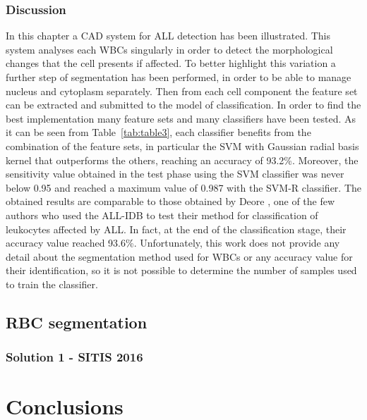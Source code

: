 \documentclass[final,a4paper,12pt,english]{UnicaPhdThesis3}
\begin{document}
\section{Discussion}
In this chapter a CAD system for ALL detection has been illustrated. This system analyses each WBCs singularly in order to detect the morphological changes that the cell presents if affected. To better highlight this variation a further step of segmentation has been performed, in order to be able to manage nucleus and cytoplasm separately. Then from each cell component the feature set can be extracted and submitted to the model of classification. In order to find the best implementation many feature sets and many classifiers have been tested. As it can be seen from Table~\ref{tab:table3}, each classifier benefits from the combination of the feature sets, in particular the SVM with Gaussian radial basis kernel that outperforms the others, reaching an accuracy of 93.2\%. Moreover, the sensitivity value obtained  in the test  phase using the SVM classifier was never below 0.95 and reached a maximum  value of 0.987 with the SVM-R classifier. The obtained results are comparable to those obtained by Deore \cite{Deore}, one of the few authors who used the ALL-IDB to test their method for classification of leukocytes affected by ALL. In fact, at  the end of the classification stage, their accuracy value reached 93.6\%. Unfortunately, this work does not provide any detail about the segmentation  method used for WBCs or any accuracy  value for their  identification,  so it is not possible to determine  the number of samples used to train the classifier.

\chapter{RBC segmentation}
\section{Solution 1 - SITIS 2016}

\part{Conclusions} 
\end{document}
